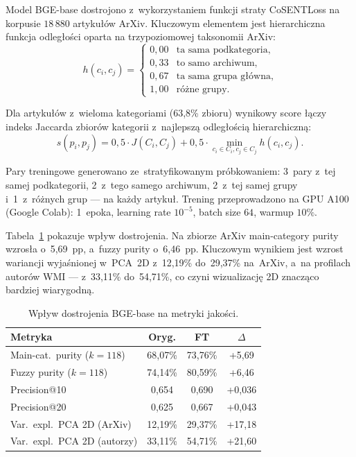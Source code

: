 \documentclass[a4paper,11pt,twocolumn]{article}
\begin{document}
Model BGE-base dostrojono z~wykorzystaniem funkcji straty CoSENTLoss
na korpusie $18\,880$ artykułów ArXiv. Kluczowym elementem jest
hierarchiczna funkcja odległości oparta na trzypoziomowej taksonomii
ArXiv:
\begin{equation}
  h(c_i, c_j) = \begin{cases}
    0{,}00 & \text{ta sama podkategoria,} \\
    0{,}33 & \text{to samo archiwum,} \\
    0{,}67 & \text{ta sama grupa główna,} \\
    1{,}00 & \text{różne grupy.}
  \end{cases}
  \label{eq:hierarchy}
\end{equation}

Dla artykułów z~wieloma kategoriami (63,8\% zbioru) wynikowy score
łączy indeks Jaccarda zbiorów kategorii z~najlepszą odległością
hierarchiczną:
\begin{equation}
  s(p_i, p_j) = 0{,}5 \cdot J(C_i, C_j) + 0{,}5 \cdot
  \min_{c_i \in C_i, c_j \in C_j} h(c_i, c_j).
  \label{eq:score}
\end{equation}


Pary treningowe generowano ze~stratyfikowanym próbkowaniem: 3~pary
z~tej samej podkategorii, 2~z~tego samego archiwum, 2~z~tej samej
grupy i~1~z~różnych grup --- na każdy artykuł. Trening przeprowadzono
na GPU A100 (Google Colab): 1~epoka, learning rate $10^{-5}$,
batch size $64$, warmup $10\%$.

Tabela~\ref{tab:finetune} pokazuje wpływ dostrojenia. Na zbiorze
ArXiv main-category purity wzrosła o~5,69~pp, a~fuzzy purity
o~6,46~pp. Kluczowym wynikiem jest wzrost wariancji wyjaśnionej
w~PCA~2D z~12,19\% do~29,37\% na~ArXiv, a~na profilach autorów
WMI --- z~33,11\% do~54,71\%, co czyni wizualizację 2D znacząco
bardziej wiarygodną.

\begin{table}[t]
\centering
\caption{Wpływ dostrojenia BGE-base na metryki jakości.}
\label{tab:finetune}
\small
\begin{tabular}{@{}lccc@{}}
\toprule
Metryka & Oryg. & FT & $\Delta$ \\
\midrule
Main-cat.\ purity ($k\!=\!118$) & 68,07\% & 73,76\% & +5,69 \\
Fuzzy purity ($k\!=\!118$) & 74,14\% & 80,59\% & +6,46 \\
Precision@10 & 0,654 & 0,690 & +0,036 \\
Precision@20 & 0,625 & 0,667 & +0,043 \\
Var.\ expl.\ PCA 2D (ArXiv) & 12,19\% & 29,37\% & +17,18 \\
Var.\ expl.\ PCA 2D (autorzy) & 33,11\% & 54,71\% & +21,60 \\
\bottomrule
\end{tabular}
\end{table}
\end{document}
